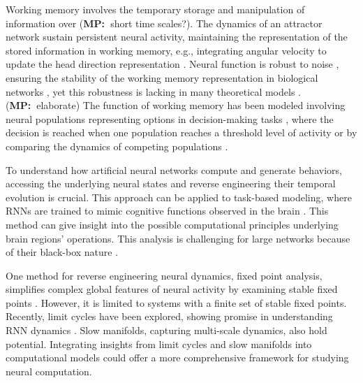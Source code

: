 \documentclass[12pt,letterpaper, onecolumn]{article}
\newcommand{\mpcomment}[1]{(\textbf{MP:\ }\textcolor{mpcolor}{#1})}
\theoremstyle{definition}
\theoremstyle{remark}
\begin{document}
Working memory involves the temporary storage and manipulation of information over \mpcomment{short time scales?}. The dynamics of an attractor network sustain persistent neural activity, maintaining the representation of the stored information in working memory, e.g., integrating angular velocity to update the head direction representation \citep{barak2013, barak2014, durstewitz2000, wolpert1995, goncalves2014, burak2009, goldman2007, aksay2007, noorman2022, cueva2021a, cueva2021b}. Neural function is robust to noise \citep{faisal2008}, ensuring the stability of the working memory representation \citep{koulakov2002} in biological networks \citep{gallego2020}, yet this robustness is lacking in many theoretical models \citep{renart2003, seeholzer2019, machens2008}.
\mpcomment{elaborate}
The function of working memory has been modeled involving neural populations representing options in decision-making tasks \citep{gold2007neural}, where the decision is reached when one population reaches a threshold level of activity or by comparing the dynamics of competing populations \citep{wong2007, wong2008, hocker2024, esnaola2022flexible}.

To understand how artificial neural networks compute and generate behaviors, accessing the underlying neural states and reverse engineering their temporal evolution is crucial. This approach can be applied to task-based modeling, where RNNs are trained to mimic cognitive functions observed in the brain \citep{darshan2022, barak2017recurrent, durstewitz2023reconstructing, yang2019task, yang2019multiple, yang2020artificial, jarne2023b, song2016}. This method can give insight into the possible computational principles underlying brain regions' operations. This analysis is challenging for large networks because of their black-box nature \citep{lipton2018, erasmus2021}.


One method for reverse engineering neural dynamics, fixed point analysis, simplifies complex global features of neural activity by examining stable fixed points \citep{sussillo2013blackbox, sussillo2014, beer2018, maheswaranathan2019universality, driscoll2022, mante2013context}. However, it is limited to systems with a finite set of stable fixed points. Recently, limit cycles have been explored, showing promise in understanding RNN dynamics \citep{pals2024}. Slow manifolds, capturing multi-scale dynamics, also hold potential. Integrating insights from limit cycles and slow manifolds into computational models could offer a more comprehensive framework for studying neural computation.
\end{document}
